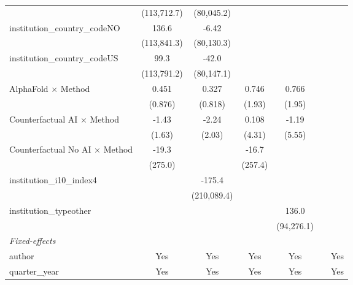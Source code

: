 \begin{tabular}{lcccccc}
                                         & (113,712.7) & (80,045.2)  &             &             &       &   \\   
   institution\_country\_codeNO          & 136.6       & -6.42       &             &             &       &   \\   
                                         & (113,841.3) & (80,130.3)  &             &             &       &   \\   
   institution\_country\_codeUS          & 99.3        & -42.0       &             &             &       &   \\   
                                         & (113,791.2) & (80,147.1)  &             &             &       &   \\   
   AlphaFold $\times$ Method             & 0.451       & 0.327       & 0.746       & 0.766       &       &   \\   
                                         & (0.876)     & (0.818)     & (1.93)      & (1.95)      &       &   \\   
   Counterfactual AI $\times$ Method     & -1.43       & -2.24       & 0.108       & -1.19       &       &   \\   
                                         & (1.63)      & (2.03)      & (4.31)      & (5.55)      &       &   \\   
   Counterfactual No AI $\times$ Method  & -19.3       &             & -16.7       &             &       &   \\   
                                         & (275.0)     &             & (257.4)     &             &       &   \\   
   institution\_i10\_index4              &             & -175.4      &             &             &       &   \\   
                                         &             & (210,089.4) &             &             &       &   \\   
   institution\_typeother                &             &             &             & 136.0       &       &   \\   
                                         &             &             &             & (94,276.1)  &       &   \\   
   \midrule
   \emph{Fixed-effects}\\
   author                                & Yes         & Yes         & Yes         & Yes         &       & Yes\\  
   quarter\_year                         & Yes         & Yes         & Yes         & Yes         &       & Yes\\  

\end{tabular}
